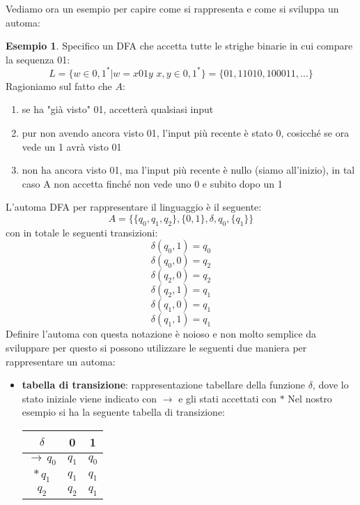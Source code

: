 \documentclass[a4paper]{book}
\theoremstyle{definition}%
\newtheorem*{esempio}{Esempio}
\begin{document}
Vediamo ora un esempio per capire come si rappresenta e come si sviluppa un automa:
\begin{esempio}
Specifico un DFA che accetta tutte le strighe binarie in cui compare la sequenza 01:
\[ L=\{w \in {0,1}^* |w  = x01y \,\, x,y \in {0,1}^*\}=\{01,11010,100011,...\} \]
Ragioniamo sul fatto che $A$:
\begin{enumerate}
\item se ha "già visto" 01, accetterà qualsiasi input
\item pur non avendo ancora visto 01, l'input più recente è stato 0, cosicché se ora vede un 1 avrà visto 01
\item non ha ancora visto 01, ma l'input più recente è nullo (siamo all'inizio), in tal caso A non accetta finché non vede
uno 0 e subito dopo un 1
\end{enumerate}
L'automa DFA per rappresentare il linguaggio è il seguente:
\[ A=\{\{q_0,q_1,q_2\} ,\{0,1\}, \delta, q_0, \{q_1\} \} \]
con in totale le seguenti transizioni:
\[ \delta(q_0,1)=q_0 \]
\[ \delta(q_0,0)=q_2 \]
\[ \delta(q_2,0)=q_2 \]
\[ \delta(q_2,1)=q_1 \]
\[ \delta(q_1,0)=q_1 \]
\[ \delta(q_1,1)=q_1 \]
Definire l'automa con questa notazione è noioso e non molto semplice da sviluppare
per questo si possono utilizzare le seguenti due maniera per rappresentare un automa:
\begin{itemize}
  \item \textbf{tabella di transizione}: rappresentazione tabellare della funzione $\delta$,
        dove lo stato iniziale viene indicato con $\to$ e gli stati accettati con $*$
        Nel nostro esempio si ha la seguente tabella di transizione:
        \begin{table}
        \centering
        \begin{tabular}{c|c|c}
        $\delta$ & 0 & 1 \\
        \hline
        $\to\,q_0$ & $q_1$ & $q_0$\\
        \hline
        $*\,q_1$ & $q_1$ & $q_1$\\
        \hline
        $q_2$ & $q_2$ & $q_1$
        \end{tabular}
        \end{table}


\end{itemize}
\end{esempio}
\end{document}
